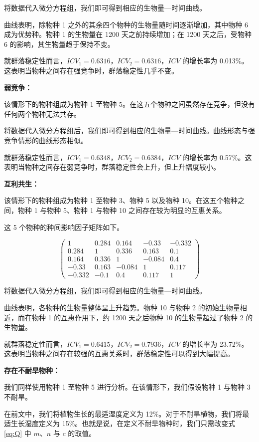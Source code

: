 \documentclass[11pt,a4paper]{ctexart}
\begin{document}
将数据代入微分方程组，我们即可得到相应的生物量—时间曲线。

曲线表明，除物种 1 之外的其余四个物种的生物量随时间逐渐增加，其中物种 6 成为优势种。物种 1 的生物量在 1200 天之前持续增加；在 1200 天之后，受物种 6 的影响，其生物量趋于保持不变。

就群落稳定性而言，$ICV_1=0.6316$，$ICV_2=0.6316$，$ICV$ 的增长率为 0.013\%。这表明当物种之间存在强竞争时，群落稳定性几乎不变。

\textbf{弱竞争：}

该情形下的物种组成为物种 1 至物种 5。在这五个物种之间虽然存在竞争，但没有任何两个物种无法共存。

将数据代入微分方程组后，我们即可得到相应的生物量—时间曲线。曲线形态与强竞争情形的曲线形态相似。

就群落稳定性而言，$ICV_1=0.6348$，$ICV_2=0.6384$，$ICV$ 的增长率为 0.57\%。这表明当物种之间存在弱竞争时，群落稳定性会上升，但上升幅度较小。

\textbf{互利共生：}

该情形下的物种组成为物种 1 至物种 3、物种 5 以及物种 10。在这五个物种之间，物种 1 与物种 5、物种 1 与物种 10 之间存在较为明显的互惠关系。

这 5 个物种的种间影响因子矩阵如下。

\[
\begin{pmatrix}
1 & 0.284 & 0.164 & -0.33 & -0.332\\
0.284 & 1 & 0.336 & 0.163 & 0.1\\
0.164 & 0.336 & 1 & -0.084 & 0.4\\
-0.33 & 0.163 & -0.084 & 1 & 0.117\\
-0.332 & -0.1 & 0.4 & 0.117 & 1
\end{pmatrix}
\]

将数据代入微分方程组，我们即可得到相应的生物量—时间曲线。

曲线表明，各物种的生物量整体呈上升趋势。物种 10 与物种 2 的初始生物量相近，而在物种 1 的互惠作用下，约 1200 天之后物种 10 的生物量超过了物种 2 的生物量。

就群落稳定性而言，$ICV_1=0.6415$，$ICV_2=0.7936$，$ICV$ 的增长率为 23.72\%。这表明当物种之间存在较强的互惠关系时，群落稳定性可以得到大幅提高。

\textbf{存在不耐旱物种：}

我们同样使用物种 1 至物种 5 进行分析。在该情形下，我们假设物种 1 与物种 3 不耐旱。

在前文中，我们将植物生长的最适湿度定义为 12\%。对于不耐旱植物，我们将最适生长湿度定义为 15\%。也就是说，在定义不耐旱物种时，我们只需改变式 \eqref{eq:Q} 中 $m$、$n$ 与 $c$ 的取值。
\end{document}
